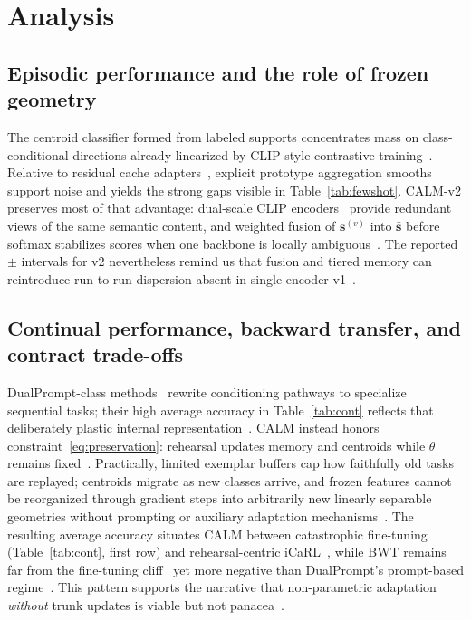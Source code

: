 \documentclass[12pt,a4paper]{report}
\begin{document}
\section{Analysis}
\subsection{Episodic performance and the role of frozen geometry}
The centroid classifier formed from labeled supports concentrates mass on class-conditional directions already linearized by CLIP-style contrastive training~\cite{r1,r27}. Relative to residual cache adapters~\cite{r4}, explicit prototype aggregation smooths support noise and yields the strong gaps visible in Table~\ref{tab:fewshot}. CALM-v2 preserves most of that advantage: dual-scale CLIP encoders~\cite{r1} provide redundant views of the same semantic content, and weighted fusion of $\mathbf{s}^{(v)}$ into $\bar{\mathbf{s}}$ before softmax stabilizes scores when one backbone is locally ambiguous~\cite{r21}. The reported $\pm$ intervals for v2 nevertheless remind us that fusion and tiered memory can reintroduce run-to-run dispersion absent in single-encoder v1~\cite{r5}.

\subsection{Continual performance, backward transfer, and contract trade-offs}
DualPrompt-class methods~\cite{r8,r17} rewrite conditioning pathways to specialize sequential tasks; their high average accuracy in Table~\ref{tab:cont} reflects that deliberately plastic internal representation~\cite{r8,r17}. CALM instead honors constraint~\eqref{eq:preservation}: rehearsal updates memory and centroids while $\theta$ remains fixed~\cite{r7,r9}. Practically, limited exemplar buffers cap how faithfully old tasks are replayed; centroids migrate as new classes arrive, and frozen features cannot be reorganized through gradient steps into arbitrarily new linearly separable geometries without prompting or auxiliary adaptation mechanisms~\cite{r6,r17}. The resulting average accuracy situates CALM between catastrophic fine-tuning (Table~\ref{tab:cont}, first row) and rehearsal-centric iCaRL~\cite{r7}, while BWT remains far from the fine-tuning cliff~\cite{r6} yet more negative than DualPrompt's prompt-based regime~\cite{r8}. This pattern supports the narrative that non-parametric adaptation \emph{without} trunk updates is viable but not panacea~\cite{r9,r19}.
\end{document}

